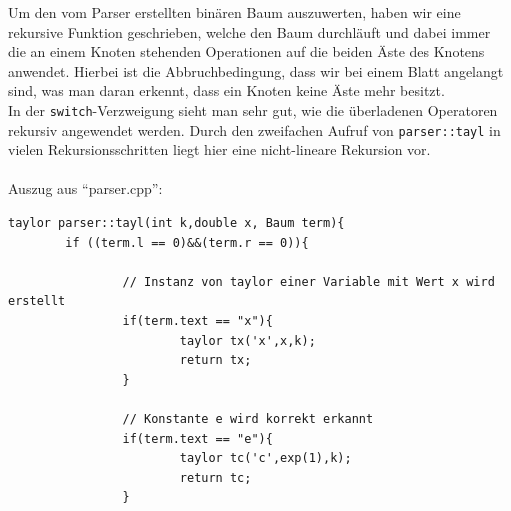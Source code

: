 \documentclass{scrartcl}
\begin{document}
Um den vom Parser erstellten binären Baum auszuwerten, haben wir eine rekursive Funktion geschrieben, welche den Baum durchläuft und dabei immer die an einem Knoten stehenden Operationen auf die beiden Äste des Knotens anwendet. Hierbei ist die Abbruchbedingung, dass wir bei einem Blatt angelangt sind, was man daran erkennt, dass ein Knoten keine Äste mehr besitzt.\\
In der \texttt{switch}-Verzweigung sieht man sehr gut, wie die überladenen Operatoren rekursiv angewendet werden. Durch den zweifachen Aufruf von \texttt{parser::tayl} in vielen Rekursionsschritten liegt hier eine nicht-lineare Rekursion vor.\\
\\
Auszug aus "`parser.cpp"':
\begin{verbatim}
taylor parser::tayl(int k,double x, Baum term){
        if ((term.l == 0)&&(term.r == 0)){	
		
                // Instanz von taylor einer Variable mit Wert x wird erstellt
                if(term.text == "x"){
                        taylor tx('x',x,k);
                        return tx;
                }
		
                // Konstante e wird korrekt erkannt
                if(term.text == "e"){
                        taylor tc('c',exp(1),k);
                        return tc;
                }
		

\end{verbatim}
\end{document}
